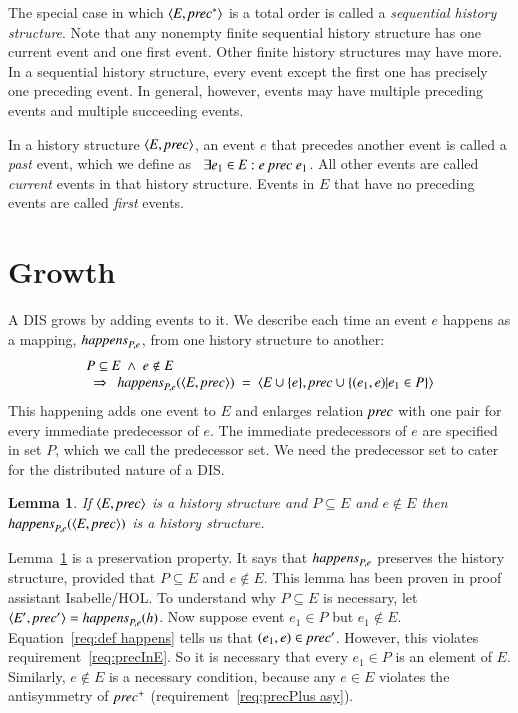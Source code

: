 \documentclass{elsarticle}
\newtheorem{lemma}{Lemma}
\def\id#1{\text{\em #1\/}}
\def\Events{{\mathit E}}
\begin{document}
	The special case in which $\la\Events,\id{prec}^*\ra$ is a total order is called a {\em sequential history structure}.
	Note that any nonempty finite sequential history structure has one current event and one first event.
	Other finite history structures may have more.
	In a sequential history structure, every event except the first one has precisely one preceding event.
	In general, however, events may have multiple preceding events and multiple succeeding events.

	In a history structure $\la \Events, \id{prec}\ra$, an event $e$ that precedes another event is called a {\em past} event,
	which we define as \ $\exists e_1\in\Events: e\ \id{prec}\ e_1$.
	All other events are called {\em current} events in that history structure.
	Events in $\Events$ that have no preceding events are called {\em first} events.

\section{Growth}
\label{sct:Growth}
	A DIS grows by adding events to it.
	We describe each time an event $e$ happens as a mapping, $\id{happens}_{P,e}$, from one history structure to another:
\begin{equation}
\begin{array}{l}
	P\subseteq\Events\ \wedge\ e\notin E\\
	\ \ \Rightarrow\ \ \id{happens}_{P,e}(\la \Events, \id{prec}\ra)\ =\ \la \Events\cup\{e\}, \id{prec}\cup\{(e_1,e) | e_1\in P\}\ra
\end{array}
\label{req:def happens}
\end{equation}
	This happening adds one event to $\Events$ and enlarges relation $\id{prec}$ with one pair for every immediate predecessor of $e$.
	The immediate predecessors of $e$ are specified in set $P$, which we call the predecessor set.
	We need the predecessor set to cater for the distributed nature of a DIS.
\begin{lemma}
\label{lemma:happens preserves history structure}
	If $\la \Events, \id{prec}\ra$ is a history structure and $P\subseteq\Events$ and $e\notin\Events$
	then $\id{happens}_{P,e}(\la \Events, \id{prec}\ra)$ is a history structure.
\end{lemma}
	Lemma~\ref{lemma:happens preserves history structure} is a preservation property.
	It says that $\id{happens}_{P,e}$ preserves the history structure,
	provided that $P\subseteq\Events$ and $e\notin\Events$.
	This lemma has been proven in proof assistant Isabelle/HOL.
	To understand why $P\subseteq\Events$ is necessary,
	let $\la \Events', \id{prec}'\ra=\id{happens}_{P,e}(h)$.
	Now suppose event $e_1\in P$ but $e_1\notin\Events$.
	Equation~\ref{req:def happens} tells us that $(e_1,e)\in\id{prec}'$.
	However, this violates requirement~\ref{req:precInE}.
	So it is necessary that every $e_1\in P$ is an element of $\Events$.
	Similarly, $e\notin\Events$ is a necessary condition,
	because any $e\in\Events$ violates the antisymmetry of $\id{prec}^+$ (requirement~\ref{req:precPlus asy}).
\end{document}
